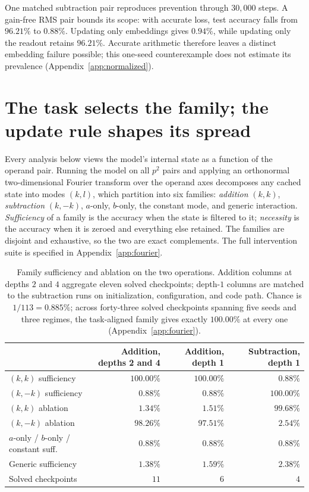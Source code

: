 \documentclass{article}
\begin{document}
One matched subtraction pair reproduces prevention through $30{,}000$ steps. A gain-free RMS pair bounds its scope: with accurate loss, test accuracy falls from $96.21\%$ to $0.88\%$. Updating only embeddings gives $0.94\%$, while updating only the readout retains $96.21\%$. Accurate arithmetic therefore leaves a distinct embedding failure possible; this one-seed counterexample does not estimate its prevalence (Appendix~\ref{app:normalized}).

\section{The task selects the family; the update rule shapes its spread}
\label{sec:family}

Every analysis below views the model's internal state as a function of the operand pair. Running the model on all $p^2$ pairs and applying an orthonormal two-dimensional Fourier transform over the operand axes decomposes any cached state into modes $(k,l)$, which partition into six families: \emph{addition} $(k,k)$, \emph{subtraction} $(k,-k)$, $a$-only, $b$-only, the constant mode, and generic interaction. \emph{Sufficiency} of a family is the accuracy when the state is filtered to it; \emph{necessity} is the accuracy when it is zeroed and everything else retained. The families are disjoint and exhaustive, so the two are exact complements. The full intervention suite is specified in Appendix~\ref{app:fourier}.

\begin{table}[t]
\centering
\caption{Family sufficiency and ablation on the two operations. Addition columns at depths $2$ and $4$ aggregate eleven solved checkpoints; depth-$1$ columns are matched to the subtraction runs on initialization, configuration, and code path. Chance is $1/113=0.885\%$; across forty-three solved checkpoints spanning five seeds and three regimes, the task-aligned family gives exactly $100.00\%$ at every one (Appendix~\ref{app:fourier}).}
\label{tab:swap}
\small
\begin{tabular}{lrrr}
\toprule
 & Addition, depths 2 and 4 & Addition, depth 1 & Subtraction, depth 1 \\
\midrule
$(k,k)$ sufficiency & $100.00\%$ & $100.00\%$ & $0.88\%$ \\
$(k,-k)$ sufficiency & $0.88\%$ & $0.88\%$ & $100.00\%$ \\
$(k,k)$ ablation & $1.34\%$ & $1.51\%$ & $99.68\%$ \\
$(k,-k)$ ablation & $98.26\%$ & $97.51\%$ & $2.54\%$ \\
$a$-only / $b$-only / constant suff. & $0.88\%$ & $0.88\%$ & $0.88\%$ \\
Generic sufficiency & $1.38\%$ & $1.59\%$ & $2.38\%$ \\
Solved checkpoints & $11$ & $6$ & $4$ \\
\bottomrule
\end{tabular}
\end{table}
\end{document}
